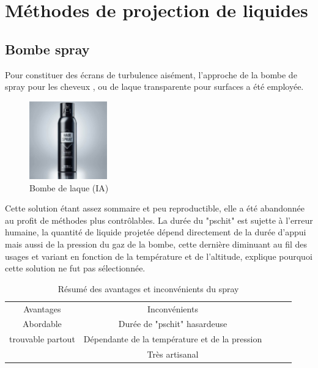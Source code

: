 

\section{Méthodes de projection de liquides}\label{sec:etat de lart}
\subsection{Bombe spray}
Pour constituer des écrans de turbulence aisément, l'approche de la bombe de spray pour les cheveux
, ou de laque transparente pour surfaces a été employée.
\begin{figure}[H]
    \centering
    \includegraphics[width=0.3\textwidth,trim={4cm 0 4cm 0},clip]{assets/figures/etat_art/airspray.jpeg}

    \caption{Bombe de laque (IA)}
\end{figure}
Cette solution étant assez sommaire et peu reproductible, elle a été abandonnée au profit de méthodes plus contrôlables.
La durée du "pschit" est sujette à l'erreur humaine, la quantité de liquide projetée
dépend directement de la durée d'appui mais aussi de la pression du gaz de la bombe, cette
dernière diminuant au fil des usages et variant en fonction de la température et de l'altitude,
explique pourquoi cette solution ne fut pas sélectionnée.

\begin{table}[H]
    \centering
    \begin{tabular}{|c|c|lll}
        \cline{1-2}
        Avantages                                 & Inconvénients                                                          &  &  & \\ \cline{1-2}
        \cellcolor[HTML]{67FD9A}Abordable         & \cellcolor[HTML]{FD6864}Durée de "pschit" hasardeuse                   &  &  & \\ \cline{1-2}
        \cellcolor[HTML]{67FD9A}trouvable partout & \cellcolor[HTML]{FD6864}Dépendante de la température et de la pression &  &  & \\ \cline{1-2}
                                                  & \cellcolor[HTML]{FD6864}Très artisanal                                 &  &  & \\ \cline{1-2}
    \end{tabular}
    \caption{Résumé des avantages et inconvénients du spray}
    \label{tab:hair_spray_table}
\end{table}

